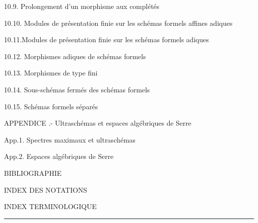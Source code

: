 
10.9. Prolongement d'un morphisme aux complétés\dotfill

10.10. Modules de présentation finie sur les schémas formels affines adiques\dotfill

10.11.Modules de présentation finie sur les schémas formels adiques\dotfill

10.12. Morphismes adiques de schémas formels\dotfill
{}

10.13. Morphismes de type fini\dotfill

10.14. Sous-schémas fermés des schémas formels\dotfill

10.15. Schémas formels séparés\dotfill

APPENDICE .- Ultraschémas et espaces algébriques de Serre\dotfill

App.1. Spectres maximaux et ultraschémas\dotfill

App.2. Espaces algébriques de Serre\dotfill

BIBLIOGRAPHIE\dotfill

INDEX DES NOTATIONS\dotfill

INDEX TERMINOLOGIQUE\dotfill

\begin{center}\rule{2cm}{0.4pt}\end{center}
